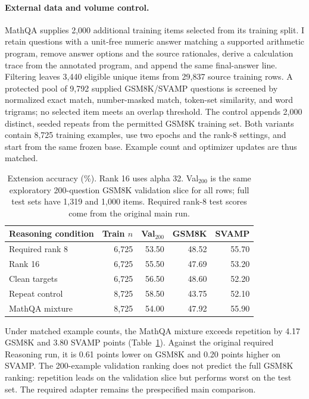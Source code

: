 \documentclass[11pt]{article}
\begin{document}
\paragraph{External data and volume control.} MathQA \citep{amini2019mathqa} supplies 2,000 additional training items selected from its training split. I retain questions with a unit-free numeric answer matching a supported arithmetic program, remove answer options and the source rationales, derive a calculation trace from the annotated program, and append the same final-answer line. Filtering leaves 3,440 eligible unique items from 29,837 source training rows. A protected pool of 9,792 supplied GSM8K/SVAMP questions is screened by normalized exact match, number-masked match, token-set similarity, and word trigrams; no selected item meets an overlap threshold. The control appends 2,000 distinct, seeded repeats from the permitted GSM8K training set. Both variants contain 8,725 training examples, use two epochs and the rank-8 settings, and start from the same frozen base. Example count and optimizer updates are thus matched.

\begin{table}[t]
\centering
\footnotesize
\setlength{\tabcolsep}{2pt}
\begin{tabular}{@{}lrrrr@{}}
\toprule
Reasoning condition & Train $n$ & Val$_{200}$ & GSM8K & SVAMP \\
\midrule
Required rank 8 & 6,725 & 53.50 & 48.52 & 55.70 \\
Rank 16 & 6,725 & 55.50 & 47.69 & 53.20 \\
Clean targets & 6,725 & 56.50 & 48.60 & 52.20 \\
Repeat control & 8,725 & 58.50 & 43.75 & 52.10 \\
MathQA mixture & 8,725 & 54.00 & 47.92 & 55.90 \\
\bottomrule
\end{tabular}
\caption{Extension accuracy (\%). Rank 16 uses alpha 32. Val$_{200}$ is the same exploratory 200-question GSM8K validation slice for all rows; full test sets have 1,319 and 1,000 items. Required rank-8 test scores come from the original main run.}
\label{tab:optional}
\end{table}

Under matched example counts, the MathQA mixture exceeds repetition by 4.17 GSM8K and 3.80 SVAMP points (Table~\ref{tab:optional}). Against the original required Reasoning run, it is 0.61 points lower on GSM8K and 0.20 points higher on SVAMP. The 200-example validation ranking does not predict the full GSM8K ranking: repetition leads on the validation slice but performs worst on the test set. The required adapter remains the prespecified main comparison.
\end{document}
